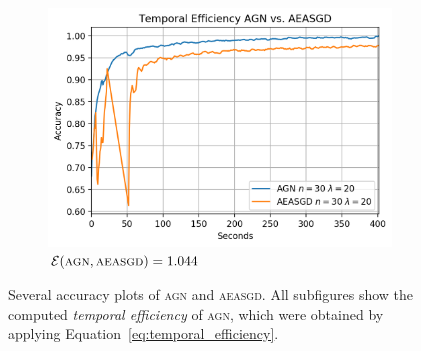 \begin{figure}[H]
\begin{subfigure}{.3\textwidth}
    \includegraphics[width=\linewidth]{resources/images/agn_aeasgd_temporal_best}
    \caption{$\mathcal{E}(\textsc{agn}, \textsc{aeasgd}) = 1.044$}
  \end{subfigure}
  \caption{Several accuracy plots of \textsc{agn} and \textsc{aeasgd}. All subfigures show the computed \emph{temporal efficiency} of \textsc{agn}, which were obtained by applying Equation~\ref{eq:temporal_efficiency}.}
\end{figure}

